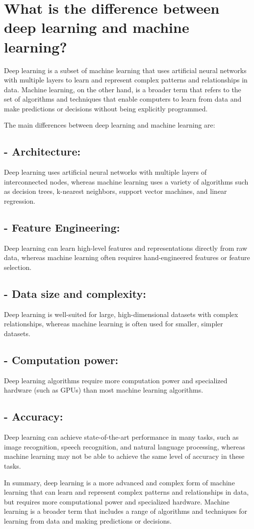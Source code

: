 \section{What is the difference between deep learning and machine learning?}
Deep learning is a subset of machine learning that uses artificial neural networks with multiple layers to learn and represent complex patterns and relationships in data. Machine learning, on the other hand, is a broader term that refers to the set of algorithms and techniques that enable computers to learn from data and make predictions or decisions without being explicitly programmed.

The main differences between deep learning and machine learning are:

\subsection{- Architecture:}  Deep learning uses artificial neural networks with multiple layers of interconnected nodes, whereas machine learning uses a variety of algorithms such as decision trees, k-nearest neighbors, support vector machines, and linear regression.

\subsection{- Feature Engineering:}  Deep learning can learn high-level features and representations directly from raw data, whereas machine learning often requires hand-engineered features or feature selection.

\subsection{- Data size and complexity:}  Deep learning is well-suited for large, high-dimensional datasets with complex relationships, whereas machine learning is often used for smaller, simpler datasets.

\subsection{- Computation power:}  Deep learning algorithms require more computation power and specialized hardware (such as GPUs) than most machine learning algorithms.

\subsection{- Accuracy:}  Deep learning can achieve state-of-the-art performance in many tasks, such as image recognition, speech recognition, and natural language processing, whereas machine learning may not be able to achieve the same level of accuracy in these tasks.

In summary, deep learning is a more advanced and complex form of machine learning that can learn and represent complex patterns and relationships in data, but requires more computational power and specialized hardware. Machine learning is a broader term that includes a range of algorithms and techniques for learning from data and making predictions or decisions.


